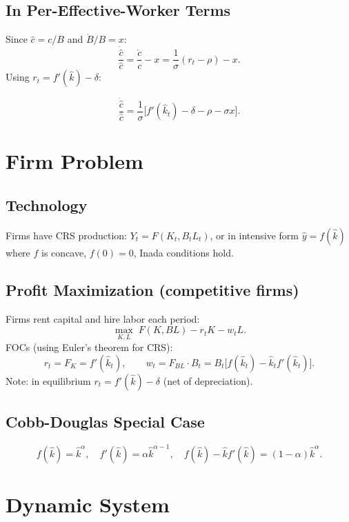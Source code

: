 \documentclass[a4paper,11pt]{article}
\newcommand{\khat}{\hat{k}}
\newcommand{\chat}{\hat{c}}
\newcommand{\yhat}{\hat{y}}
\begin{document}
\subsection*{In Per-Effective-Worker Terms}
Since $\chat = c/B$ and $\dot{B}/B = x$:
\[
  \frac{\dot{\chat}}{\chat} = \frac{\dot{c}}{c} - x
  = \frac{1}{\sigma}(r_t - \rho) - x.
\]
Using $r_t = f'(\khat) - \delta$:
\begin{keyformulabox}
\[
  \frac{\dot{\chat}}{\chat}
  = \frac{1}{\sigma}\bigl[f'(\khat_t) - \delta - \rho - \sigma x\bigr]. \tag{Euler-hat}
\]
\end{keyformulabox}

\section{Firm Problem}

\subsection*{Technology}
Firms have CRS production: $Y_t = F(K_t, B_t L_t)$, or in intensive form $\yhat = f(\khat)$ where $f$ is concave, $f(0) = 0$, Inada conditions hold.

\subsection*{Profit Maximization (competitive firms)}
Firms rent capital and hire labor each period:
\[
  \max_{K,L} \; F(K, BL) - r_t K - w_t L.
\]
FOCs (using Euler's theorem for CRS):
\[
  r_t = F_K = f'(\khat_t), \qquad
  w_t = F_{BL} \cdot B_t = B_t\bigl[f(\khat_t) - \khat_t f'(\khat_t)\bigr].
\]
Note: in equilibrium $r_t = f'(\khat) - \delta$ (net of depreciation).

\subsection*{Cobb-Douglas Special Case}
\[
  f(\khat) = \khat^{\alpha}, \quad
  f'(\khat) = \alpha \khat^{\alpha - 1}, \quad
  f(\khat) - \khat f'(\khat) = (1-\alpha)\khat^{\alpha}.
\]

\section{Dynamic System}
\end{document}
